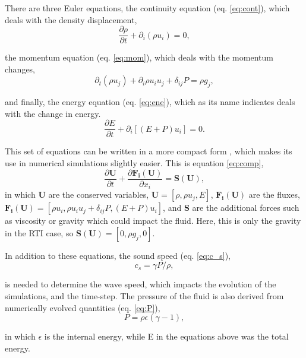 \documentclass[a4paper,12pt]{article}
\begin{document}
There are three Euler equations, the continuity equation (eq. \ref{eq:cont}), which deals with the density displacement,
\begin{equation}
  \label{eq:cont}
  \frac{\partial \rho}{\partial t} + \partial_i(\rho u_i) = 0,
\end{equation}

\noindent the momentum equation (eq. \ref{eq:mom}), which deals with the momentum changes,
\begin{equation}
  \label{eq:mom}
  \partial_t(\rho u_j) + \partial_i\rho u_iu_j + \delta_{ij}P = \rho g_j,
\end{equation}


\noindent and finally, the energy equation (eq. \ref{eq:ene}), which as its name indicates deals with the change in energy.
\begin{equation}
  \label{eq:ene}
  \frac{\partial E}{\partial t} + \partial_i[(E+P)u_i] = 0.
\end{equation}

\noindent This set of equations can be written in a more compact form \parencite{oconnor_eulerian_2026}, which makes its use in numerical simulations slightly easier. This is equation \ref{eq:comp},
\begin{equation}
  \label{eq:comp}
  \frac{\partial \mathbf{U}}{\partial t} + \frac{\partial \mathbf{F_i(U)}}{\partial x_i} = \mathbf{S(U)},
\end{equation}
in which \textbf{U} are the conserved variables, $\mathbf{U} = [\rho, \rho u_j, E]$, $\mathbf{F_i(U)}$ are the fluxes, $\mathbf{F_i(U)} = [\rho u_i, \rho u_i u_j + \delta_{ij}P, (E+P)u_i]$, and \textbf{S} are the additional forces such as viscosity or gravity which could impact the fluid. Here, this is only the gravity in the RTI case, so $\mathbf{S(U)} = [0, \rho g_j, 0]$. 

In addition to these equations, the sound speed (eq. \ref{eq:c_s}),
\begin{equation}
  \label{eq:c_s}
  c_s = \gamma P/\rho,
\end{equation}

\noindent is needed to determine the wave speed, which impacts the evolution of the simulations, and the time-step. The pressure of the fluid is also derived from numerically evolved quantities (eq. \ref{eq:P}),
\begin{equation}
  \label{eq:P}
  P = \rho\epsilon(\gamma-1),
\end{equation} 

\noindent in which $\epsilon$ is the internal energy, while E in the equations above was the total energy.
\end{document}
